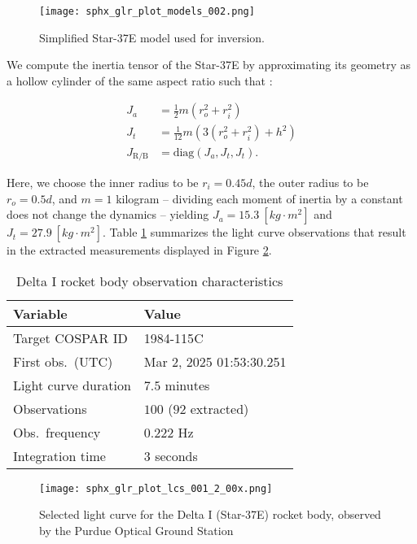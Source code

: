 \documentclass[a4paper,twocolumn]{spaceDebrisC} %
\newcommand{\figbig}[0]{0.5\textwidth}
\begin{document}
\begin{figure}[H]
  \centering
  \texttt{[image: sphx\_glr\_plot\_models\_002.png]}
  \caption{Simplified Star-37E model used for inversion.}
  \label{fig:star37e_simple}
\end{figure}

We compute the inertia tensor of the Star-37E by approximating its geometry as a hollow cylinder of the same aspect ratio such that \cite{serway2019}:

\begin{align}
 J_a &= \frac{1}{2} m \left(r_o^2+r_i^2\right) \\
 J_t &= \frac{1}{12} m \left(3 \left(r_o^2+r_i^2\right) + h^2\right) \\
 J_\text{R/B} &= \text{diag} \left(J_a, J_t, J_t\right).
\end{align}

Here, we choose the inner radius to be $r_i=0.45d$, the outer radius to be $r_o=0.5d$, and $m=1$ kilogram -- dividing each moment of inertia by a constant does not change the dynamics -- yielding $J_a = 15.3 \: [kg \cdot m^2]$ and $J_t = 27.9 \: [kg \cdot m^2]$. Table \ref{tb:case2_in} summarizes the light curve observations that result in the extracted measurements displayed in Figure \ref{fig:rb_lc_obs}.

\begin{table}[H]
  \centering
  \caption{Delta I rocket body observation characteristics}
  \vspace*{6pt}
  \begin{tabular}{|l|l|}
  \hline
  \textbf{Variable} & \textbf{Value} \\ \hline
 Target COSPAR ID & 1984-115C \\ \hline
 First obs.\ (UTC) & Mar 2, 2025 01:53:30.251 \\ \hline
 Light curve duration & $7.5$ minutes \\ \hline
 Observations & $100$ ($92$ extracted) \\ \hline
 Obs.\ frequency & $0.222$ Hz \\ \hline
 Integration time & $3$ seconds \\ \hline
  \end{tabular}
  \label{tb:case2_in}
\end{table}

\begin{figure}[H]
  \centering
  \texttt{[image: sphx\_glr\_plot\_lcs\_001\_2\_00x.png]}
  \caption{Selected light curve for the Delta I (Star-37E) rocket body, observed by the Purdue Optical Ground Station}
  \label{fig:rb_lc_obs}
\end{figure}
\end{document}

